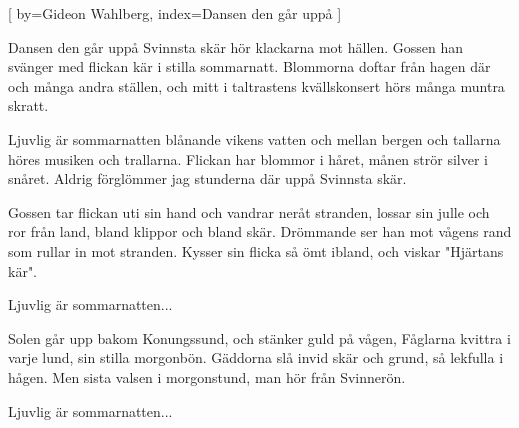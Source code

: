 


[ 	%
	by={Gideon Wahlberg},
	index={Dansen den går uppå }]		%
	
\beginverse*		%
Dansen den går uppå Svinnsta skär
hör klackarna mot hällen.
Gossen han svänger med flickan kär
i stilla sommarnatt.
Blommorna doftar från hagen där
och många andra ställen,
och mitt i taltrastens kvällskonsert
hörs många muntra skratt.
\endverse			%

\beginchorus	
Ljuvlig är sommarnatten
blånande vikens vatten
och mellan bergen och tallarna
höres musiken och trallarna.
Flickan har blommor i håret,
månen strör silver i snåret.
Aldrig förglömmer jag stunderna där
uppå Svinnsta skär.
\endchorus

\beginverse*		%
Gossen tar flickan uti sin hand 
och vandrar neråt stranden,
lossar sin julle och ror från land, 
bland klippor och bland skär.
Drömmande ser han mot vågens rand
som rullar in mot stranden.
Kysser sin flicka så ömt ibland, 
och viskar "Hjärtans kär".
\endverse			%

\beginchorus	
Ljuvlig är sommarnatten...
\endchorus

\beginverse*		%
Solen går upp bakom Konungssund, 
och stänker guld på vågen,
Fåglarna kvittra i varje lund, 
sin stilla morgonbön.
Gäddorna slå invid skär och grund, 
så lekfulla i hågen.
Men sista valsen i morgonstund, 
man hör från Svinnerön.
\endverse			%

\beginchorus	
Ljuvlig är sommarnatten...
\endchorus
\endsong			%
